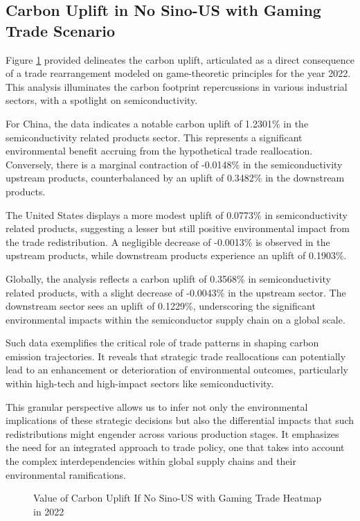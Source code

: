\subsection{Carbon Uplift in No Sino-US with Gaming Trade Scenario}

Figure \ref{fig:Value of Carbon Uplift If No Sino-US with Gaming Trade Heatmap in 2022} provided delineates the carbon uplift, articulated as a direct consequence of a trade rearrangement modeled on game-theoretic principles for the year 2022. This analysis illuminates the carbon footprint repercussions in various industrial sectors, with a spotlight on semiconductivity.

For China, the data indicates a notable carbon uplift of 1.2301\% in the semiconductivity related products sector. This represents a significant environmental benefit accruing from the hypothetical trade reallocation. Conversely, there is a marginal contraction of -0.0148\% in the semiconductivity upstream products, counterbalanced by an uplift of 0.3482\% in the downstream products.

The United States displays a more modest uplift of 0.0773\% in semiconductivity related products, suggesting a lesser but still positive environmental impact from the trade redistribution. A negligible decrease of -0.0013\% is observed in the upstream products, while downstream products experience an uplift of 0.1903\%.

Globally, the analysis reflects a carbon uplift of 0.3568\% in semiconductivity related products, with a slight decrease of -0.0043\% in the upstream sector. The downstream sector sees an uplift of 0.1229\%, underscoring the significant environmental impacts within the semiconductor supply chain on a global scale.

Such data exemplifies the critical role of trade patterns in shaping carbon emission trajectories. It reveals that strategic trade reallocations can potentially lead to an enhancement or deterioration of environmental outcomes, particularly within high-tech and high-impact sectors like semiconductivity.

This granular perspective allows us to infer not only the environmental implications of these strategic decisions but also the differential impacts that such redistributions might engender across various production stages. It emphasizes the need for an integrated approach to trade policy, one that takes into account the complex interdependencies within global supply chains and their environmental ramifications.
\ifincludefigures
\begin{figure}
  \centering
  \caption{Value of Carbon Uplift If No Sino-US with Gaming Trade Heatmap in 2022}\label{fig:Value of Carbon Uplift If No Sino-US with Gaming Trade Heatmap in 2022}
 \end{figure}
\fi
